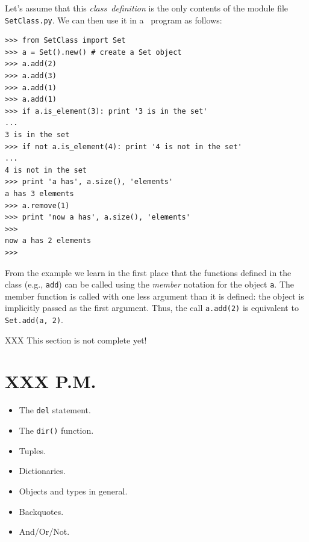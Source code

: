 Let's assume that this
{\em class\ definition}
is the only contents of the module file
{\tt SetClass.py}.
We can then use it in a \Python\ program as follows:
\bcode\begin{verbatim}
>>> from SetClass import Set
>>> a = Set().new() # create a Set object
>>> a.add(2)
>>> a.add(3)
>>> a.add(1)
>>> a.add(1)
>>> if a.is_element(3): print '3 is in the set'
... 
3 is in the set
>>> if not a.is_element(4): print '4 is not in the set'
... 
4 is not in the set
>>> print 'a has', a.size(), 'elements'
a has 3 elements
>>> a.remove(1)
>>> print 'now a has', a.size(), 'elements'
>>> 
now a has 2 elements
>>> 
\end{verbatim}\ecode
From the example we learn in the first place that the functions defined
in the class (e.g.,
{\tt add})
can be called using the
{\em member}
notation for the object
{\tt a}.
The member function is called with one less argument than it is defined:
the object is implicitly passed as the first argument.
Thus, the call
{\tt a.add(2)}
is equivalent to
{\tt Set.add(a, 2)}.

XXX This section is not complete yet!

\section{XXX P.M.}

\begin{itemize}
\item	The {\tt del} statement.
\item	The {\tt dir()} function.
\item	Tuples.
\item	Dictionaries.
\item	Objects and types in general.
\item	Backquotes.
\item	And/Or/Not.
\end{itemize}


